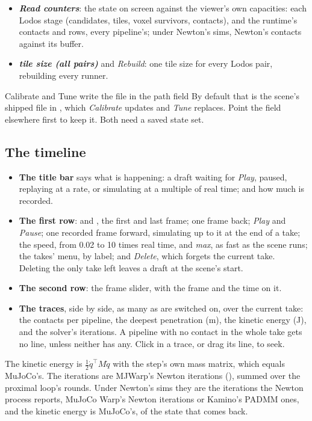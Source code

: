 \begin{itemize}
\item \textbf{\emph{Read counters}}: the state on screen against the viewer's own capacities: each Lodos stage (candidates, tiles, voxel survivors, contacts), and the runtime's contacts and rows, every pipeline's; under Newton's sims, Newton's contacts against its buffer.
\item \textbf{\emph{tile size (all pairs)}} and \emph{Rebuild}: one tile size for every Lodos pair, rebuilding every runner.
\end{itemize}

\begin{notebox}{Calibrate and Tune write the file in the path field}
By default that is the scene's shipped file in , which \emph{Calibrate} updates and \emph{Tune} replaces. Point the field elsewhere first to keep it. Both need a saved state set.
\end{notebox}

\subsection{The timeline}\label{sec:timeline}

\begin{itemize}
\item \textbf{The title bar} says what is happening: a draft waiting for \emph{Play}, paused, replaying at a rate, or simulating at a multiple of real time; and how much is recorded.
\item \textbf{The first row}: \code{|<} and \code{>|}, the first and last frame; \code{<} one frame back; \emph{Play} and \emph{Pause}; \code{>} one recorded frame forward, simulating up to it at the end of a take; the speed, from 0.02 to 10 times real time, and \emph{max}, as fast as the scene runs; the takes' menu, by label; and \emph{Delete}, which forgets the current take. Deleting the only take left leaves a draft at the scene's start.
\item \textbf{The second row}: the frame slider, with the frame and the time on it.
\item \textbf{The traces}, side by side, as many as are switched on, over the current take: the contacts per pipeline, the deepest penetration (m), the kinetic energy (J), and the solver's iterations. A pipeline with no contact in the whole take gets no line, unless neither has any. Click in a trace, or drag its line, to seek.
\end{itemize}

The kinetic energy is $\frac{1}{2}\dot q^\top M \dot q$ with the step's own mass matrix, which equals MuJoCo's. The iterations are MJWarp's Newton iterations (), summed over the proximal loop's rounds. Under Newton's sims they are the iterations the Newton process reports, MuJoCo Warp's Newton iterations or Kamino's PADMM ones, and the kinetic energy is MuJoCo's, of the state that comes back.

